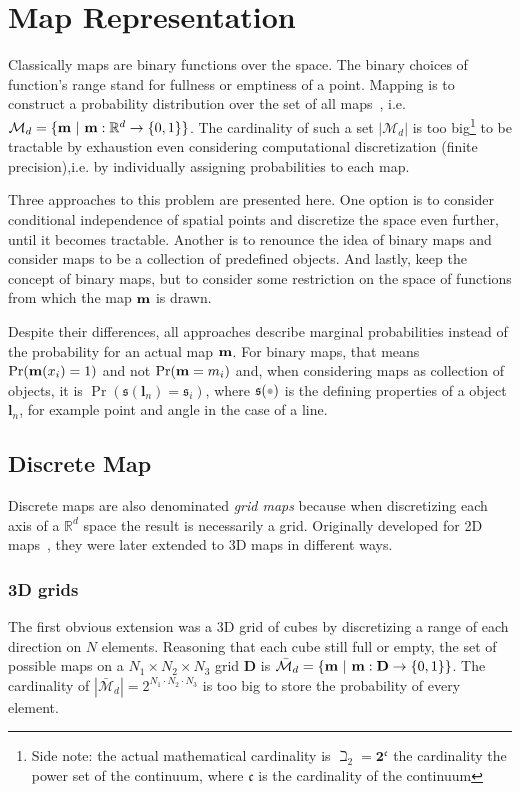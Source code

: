 \section{Map Representation}
\label{s:map_rep}
Classically maps are binary functions over the space. The binary choices of
function's range stand for fullness or emptiness of a point.
Mapping is to construct a probability distribution over the set of all
maps~\cite{thrunprob}, i.e.
$\mathcal{M}_d=\{\mathrm{\mathbf{m}}~|~\mathrm{\mathbf{m}}:\mathbb{R}^d\to\{0,1\}\}$. The
cardinality of such a set $|\mathcal{M}_d|$ is too big\footnote{Side note: the
actual mathematical cardinality is $\beth_2=\mathbf{2}^\mathfrak{c}$ the
cardinality the power set of the continuum, where $\mathfrak{c}$ is the
cardinality of the continuum } to be tractable by exhaustion even considering
computational discretization (finite precision),i.e. by individually
assigning probabilities to each map.

Three approaches to this problem are presented here. One option is to consider
conditional independence of spatial points and discretize the space even
further, until it becomes tractable.
Another is to renounce the idea of binary maps and consider maps to be a collection of predefined
objects. And lastly, keep the concept of binary maps, but to consider some
restriction on the space of functions from which the map $\mathrm{\mathbf{m}}$ is drawn.

Despite their differences, all approaches describe marginal probabilities
instead of the probability for an actual map $\mathrm{\mathbf{m}}$. For binary maps,
that means $\Pr(\mathrm{\mathbf{m}}(x_i)=1)$ and not $\Pr(\mathrm{\mathbf{m}}=m_i)$ and, when
considering maps as collection of objects, it is
$\Pr(\mathfrak{s}(\mathbf{l}_n)=\mathfrak{s}_i)$, where $\mathfrak{s}(\parm)$ is
the defining properties of a object $\mathbf{l}_n$, for example point and angle
in the case of a line.

\subsection{Discrete Map}

Discrete maps are also denominated \textit{grid maps} because when discretizing
each axis of a $\mathbb{R}^d$ space the result is necessarily a grid. Originally
developed for 2D maps~\cite{thrunprob}, they were later extended to 3D maps
in different ways.

\subsubsection{3D grids}
\label{sss:3dgrid}
The first obvious extension was a 3D grid of cubes by discretizing a range
of each direction on $N$ elements. Reasoning that each cube still full
or empty, the set of possible maps on a $N_1\times N_2\times
N_3$ grid $\mathbf{D}$ is
$\bar{\mathcal{M}}_d=\{\mathrm{\mathbf{m}}~|~\mathrm{\mathbf{m}}:\mathbf{D}\to\{0,1\}\}$. The
cardinality of $|\bar{\mathcal{M}}_d|=2^{N_1\cdot N_2\cdot
N_3}$ is too big to store the probability of every element. 

